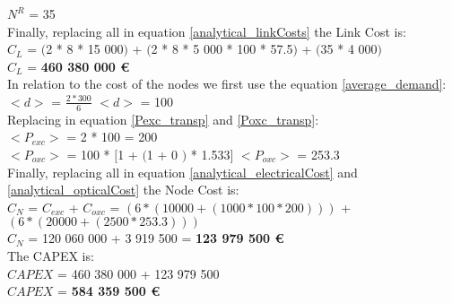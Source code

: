 $N^R$ = 35\\

Finally, replacing all in equation \ref{analytical_linkCosts} the Link Cost is:\\

$C_L$ = $($2 * 8 * 15 000$)$ + $($2 * 8 * 5 000 * 100 * 57.5$)$ + $($35 * 4 000$)$\\

$C_L$ = \textbf{460 380 000 \euro}\\

In relation to the cost of the nodes we first use the equation \ref{average_demand}:\\

$<d>$ = $\frac{2 * 300}{6}$ \qquad \qquad $<d>$ = 100\\

Replacing in equation \ref{Pexc_transp} and \ref{Poxc_transp}:\\

$<P_{exc}>$ = 2 * 100 = 200\\

$<P_{oxc}>$ = 100 * $[$1 + $($1 + $0$ $)$ * 1.533$]$ \qquad \quad $<P_{oxc}>$ = 253.3 \\

Finally, replacing all in equation \ref{analytical_electricalCost} and \ref{analytical_opticalCost} the Node Cost is:\\

$C_N$ = $C_{exc}$ + $C_{oxc}$ = $\left( 6*(10 000 + (1 000 * 100 * 200 ) ) \right)$ + $\left(6*(20 000 + (2 500 * 253.3 ) ) \right)$\\

$C_N$ = 120 060 000 + 3 919 500 = \textbf{123 979 500 \euro}\\

The CAPEX is:\\
$CAPEX$ = 460 380 000 + 123 979 500\\

$CAPEX$ = \textbf{584 359 500 \euro}\\

